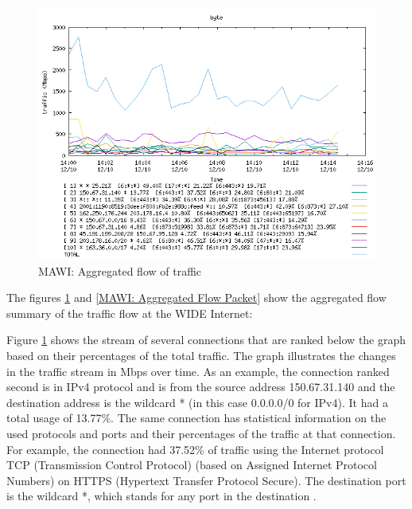 \documentclass[sigconf,authorversion,nonacm]{acmart}
\begin{document}
\begin{figure}
        \centering
        \includegraphics[width=1\linewidth]{MAWI 2023-12-10 aggregated analysis byte.png}
        \caption{MAWI: Aggregated flow of traffic}
        \label{MAWI: Aggregated Flow Byte}
\end{figure}

The figures \ref{MAWI: Aggregated Flow Byte} and \ref{MAWI: Aggregated Flow Packet} show the aggregated flow summary of the traffic flow at the WIDE Internet:

Figure \ref{MAWI: Aggregated Flow Byte} shows the stream of several connections that are ranked below the graph based on their percentages of the total traffic. The graph illustrates the changes in the traffic stream in Mbps over time. As an example, the connection ranked second is in IPv4 protocol and is from the source address 150.67.31.140 and the destination address is the wildcard * (in this case 0.0.0.0/0 for IPv4). It had a total usage of 13.77\%. The same connection has statistical information on the used protocols and ports and their percentages of the traffic at that connection. For example, the connection had 37.52\% of traffic using the Internet protocol TCP (Transmission Control Protocol) (based on Assigned Internet Protocol Numbers) on HTTPS (Hypertext Transfer Protocol Secure). The destination port is the wildcard *, which stands for any port in the destination \cite{179442}.
\end{document}
